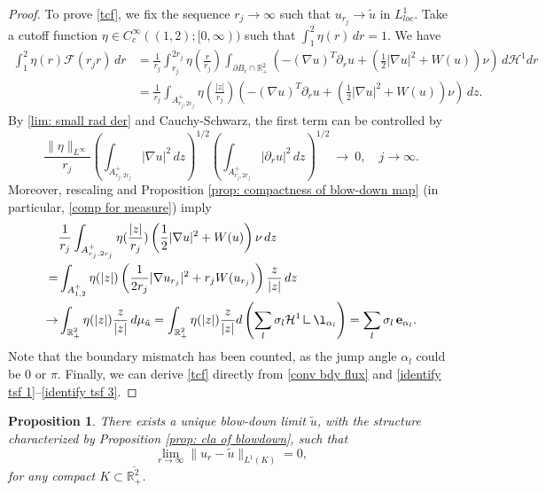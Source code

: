 \documentclass[leqno,11pt]{amsart}
\let\pa=\partial
\let\al=\alpha
\let\f=\frac
\let\pa=\partial
\let\ri=\rightarrow
\let\na=\nabla
\newtheorem{proposition}[theorem]{Proposition}
\theoremstyle{remark}
\newcommand{\BR}{\mathbb{R}}
\newcommand{\ch}{\mathcal{H}^1}
\newcommand{\tu}{\tilde{u}}
\newcommand{\mres}{\mathbin{\vrule height 1.6ex depth 0pt width 0.13ex\vrule height 0.13ex depth 0pt width 1.1ex}}
\begin{document}
\begin{proof}
To prove \eqref{tcf}, we fix the sequence $r_j\to\infty$ such that $u_{r_j}\to \tu$ in $L_{loc}^1$. Take a cutoff function $\eta\in C_c^\infty((1,2);[0,\infty))$ such that $\int_1^2 \eta(r)\,dr=1$. We have
\begin{equation}\label{identify tsf 1}
\begin{split}
    \int_1^2\eta(r)\mathcal{F}(r_jr)\,dr &=\f{1}{r_j}\int_{r_j}^{2r_j} \eta(\f{r}{r_j}) \int_{\pa B_r\cap \BR_+^2} \left(-(\na u)^T \pa_r u+ (\f12|\na u|^2+W(u))\nu\right) \,d\ch dr\\
    &= \f{1}{r_j}\int_{A_{r_j,2r_j}^+ }\eta(\f{|z|}{r_j})\left(-(\na u)^T \pa_r u+ (\f12|\na u|^2+W(u))\nu\right)\,dz.
\end{split}
\end{equation}
By \eqref{lim: small rad der} and Cauchy-Schwarz, the first term can be controlled by 
\begin{equation}\label{identify tsf 2}
    \f{\|\eta\|_{L^\infty}}{r_j} \left(\int_{A_{r_j,2r_j}^+ } |\na u|^2\,dz\right)^{1/2}\left( \int_{A_{r_j,2r_j}^+ } |\pa_r u|^2\,dz \right)^{1/2}\ \longrightarrow \ 0, \quad j\to\infty.
\end{equation}
Moreover, rescaling and Proposition \ref{prop: compactness of blow-down map} (in particular, \eqref{comp for measure}) imply
\begin{equation}\label{identify tsf 3}
    \begin{split}
        &\f{1}{r_j}\int_{A_{r_j,2r_j}^+ }\eta(\f{|z|}{r_j})\left(\f12|\na u|^2+W(u)\right)\nu\,dz\\
    =& \int_{A_{1,2}^+} \eta(|z|) \left(\f{1}{2r_j}|\na u_{r_j}|^2 +r_j W(u_{r_j})\right)\f{z}{|z|}\,dz\\
    \to & \int_{\BR_+^2} \eta(|z|) \f{z}{|z|} \,d \mu_{\tu}= \int_{\BR_+^2} \eta(|z|) \f{z}{|z|} d\left(\sum_l \sigma_l \ch \mres \l_{\al_l}\right)=\sum_{l} \sigma_l\,\mathbf{e}_{\al_l}.
    \end{split}
\end{equation}
Note that the boundary mismatch has been counted, as the jump angle $\al_l$ could be $0$ or $\pi$. Finally, we can derive \eqref{tcf} directly from \eqref{conv bdy flux} and \eqref{identify tsf 1}--\eqref{identify tsf 3}. 

\end{proof}



\begin{proposition}
    \label{prop: uniquenss of blowdown}
    There exists a unique blow-down limit $\tilde{u}$, with the structure characterized by Proposition \ref{prop: cla of blowdown}, such that 
    \begin{equation*}
        \lim\limits_{r\ri\infty} \|u_r-\tilde{u}\|_{L^1(K)}=0,
    \end{equation*}
    for any compact $K\subset \overline{\BR^2_+}$.
\end{proposition}
\end{document}
